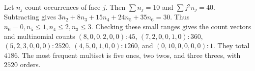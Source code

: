 Let $n_j$ count occurrences of face $j$. Then $\sum n_j=10$ and $\sum j^2n_j=40$. Subtracting gives $3n_2+8n_3+15n_4+24n_5+35n_6=30$. Thus $n_6=0,n_5\le1,n_4\le2,n_3\le3$. Checking these small ranges gives the count vectors and multinomial counts $(8,0,0,2,0,0):45$, $(7,2,0,0,1,0):360$, $(5,2,3,0,0,0):2520$, $(4,5,0,1,0,0):1260$, and $(0,10,0,0,0,0):1$. They total $\boxed{4186}$. The most frequent multiset is five ones, two twos, and three threes, with $2520$ orders.
